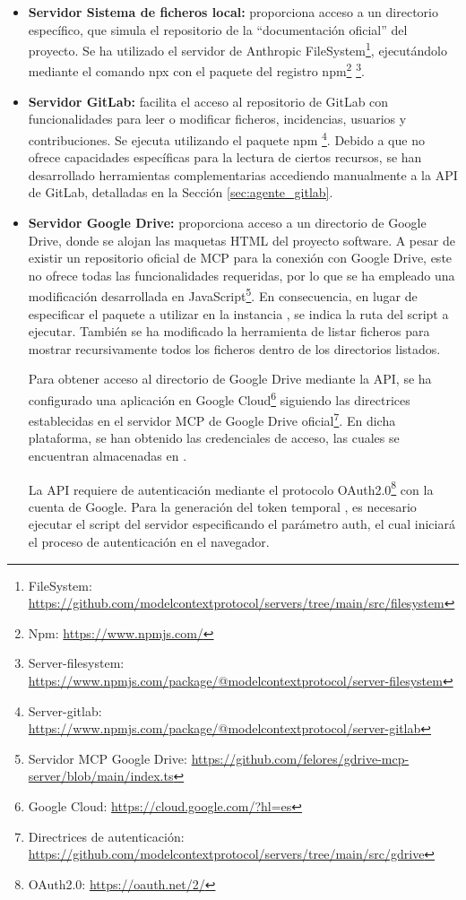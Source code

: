 \begin{itemize}
  \item\textbf{Servidor Sistema de ficheros local: }proporciona acceso a un directorio específico, que simula el repositorio de la ``documentación oficial'' del proyecto. Se ha utilizado el servidor de Anthropic FileSystem\footnote{FileSystem: \url{https://github.com/modelcontextprotocol/servers/tree/main/src/filesystem}}, ejecutándolo mediante el comando npx con el paquete del registro npm\footnote{Npm: \url{https://www.npmjs.com/}} \footnote{Server-filesystem: \url{https://www.npmjs.com/package/@modelcontextprotocol/server-filesystem}}.

  \label{sec:gitlab_mcp}
  \item\textbf{Servidor GitLab: }facilita el acceso al repositorio de GitLab con funcionalidades para leer o modificar ficheros, incidencias, usuarios y contribuciones. Se ejecuta utilizando el paquete npm \footnote{Server-gitlab: \url{https://www.npmjs.com/package/@modelcontextprotocol/server-gitlab}}. Debido a que no ofrece capacidades específicas para la lectura de ciertos recursos, se han desarrollado herramientas complementarias accediendo manualmente a la API de GitLab, detalladas en la Sección \ref{sec:agente_gitlab}.

\item\textbf{Servidor Google Drive: }proporciona acceso a un directorio de Google Drive, donde se alojan las maquetas HTML del proyecto software. A pesar de existir un repositorio oficial de MCP para la conexión con Google Drive, este no ofrece todas las funcionalidades requeridas, por lo que se ha empleado una modificación desarrollada en JavaScript\footnote{Servidor MCP Google Drive: \url{https://github.com/felores/gdrive-mcp-server/blob/main/index.ts}}. En consecuencia, en lugar de especificar el paquete a utilizar en la instancia , se indica la ruta del script a ejecutar. También se ha modificado la herramienta de listar ficheros para mostrar recursivamente todos los ficheros dentro de los directorios listados.

Para obtener acceso al directorio de Google Drive mediante la API, se ha configurado una aplicación en Google Cloud\footnote{Google Cloud: \url{https://cloud.google.com/?hl=es}} siguiendo las directrices establecidas en el servidor MCP de Google Drive oficial\footnote{Directrices de autenticación: \url{https://github.com/modelcontextprotocol/servers/tree/main/src/gdrive}}. En dicha plataforma, se han obtenido las credenciales de acceso, las cuales se encuentran almacenadas en .

La API requiere de autenticación mediante el protocolo OAuth2.0\footnote{OAuth2.0: \url{https://oauth.net/2/}} con la cuenta de Google. Para la generación del token temporal , es necesario ejecutar el script del servidor especificando el parámetro auth, el cual iniciará el proceso de autenticación en el navegador.

\end{itemize}

